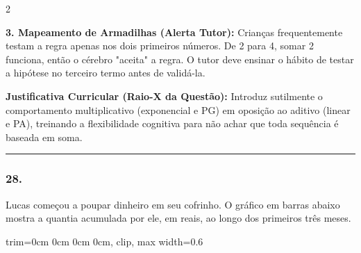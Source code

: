 \begin{multicols*}{2}
\begin{tcolorbox}[colback=CorTitUm!5, colframe=CorTitUm, boxrule=1pt, arc=4pt, left=6pt, right=6pt, top=6pt, bottom=6pt]
    \textbf{3. Mapeamento de Armadilhas (Alerta Tutor):} Crianças frequentemente testam a regra apenas nos dois primeiros números. De 2 para 4, somar 2 funciona, então o cérebro "aceita" a regra. O tutor deve ensinar o hábito de testar a hipótese no terceiro termo antes de validá-la.
    \end{tcolorbox}
    \vspace{0.15cm}
    
    \begin{boxexplicacao}
    \textbf{Justificativa Curricular (Raio-X da Questão):} Introduz sutilmente o comportamento multiplicativo (exponencial e PG) em oposição ao aditivo (linear e PA), treinando a flexibilidade cognitiva para não achar que toda sequência é baseada em soma.
    \end{boxexplicacao}
\fi

\par\vspace{\espacoQuestao}

\noindent\textcolor{CorLinha}{\rule{\linewidth}{0.5pt}} 
\par\vspace{\espacoPreQuestao}
\subsubsection*{28.} 
\begin{enunciadoLiteral}
Lucas começou a poupar dinheiro em seu cofrinho. O gráfico em barras abaixo mostra a quantia acumulada por ele, em reais, ao longo dos primeiros três meses.

\begin{center}
\begin{adjustbox}{trim=0cm 0cm 0cm 0cm, clip, max width=0.6\linewidth}
\end{adjustbox}
\end{center}
\end{enunciadoLiteral}
\end{multicols*}

